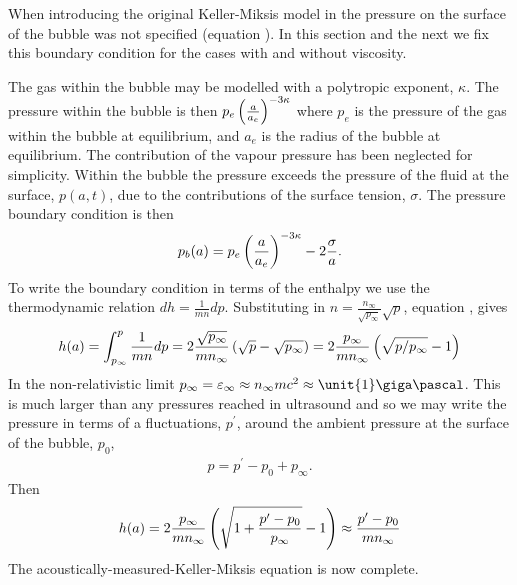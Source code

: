 When introducing the original Keller-Miksis model in  the pressure on the surface of the bubble was not specified (equation ).
In this section and the next we fix this boundary condition for the cases with and without viscosity.


The gas within the bubble may be modelled with a polytropic exponent, $\kappa$. 
The pressure within the bubble is then $p_e \left( \frac{a}{a_e} \right)^{-3\kappa}$ where $p_e$ is the pressure of the gas within the bubble at equilibrium,
and $a_e$ is the radius of the bubble at equilibrium\cite{Hoff2001}.
The contribution of the vapour pressure has been neglected for simplicity.
Within the bubble the pressure exceeds the pressure of the fluid at the surface, $p(a,t)$, due to the contributions of the surface tension, $\sigma$.
The pressure boundary condition is then
\begin{align}
  p_b(a) = p_e \left( \frac{a}{a_e} \right)^{-3\kappa} - 2\frac{\sigma}{a}. 
\end{align}
To write the boundary condition in terms of the enthalpy we use the  thermodynamic relation $d h = \frac{1}{m n} dp$.
Substituting in $n=\frac{n_\infty}{\sqrt{p_\infty}}\sqrt{p}$, equation , gives
\begin{align}
  h(a) =  \int_{p_\infty}^{p}  \frac{1}{m n}dp = 2\frac{\sqrt{p_\infty}}{mn_\infty}\left( \sqrt{p}-\sqrt{ p_\infty} \right) = 2 \frac{p_\infty}{mn_\infty} \left( \sqrt{p/p_\infty} - 1 \right) 
\end{align}
In the non-relativistic limit $p_\infty = \epsilon_\infty \approx n_\infty m c^2 \approx \unit{1}\giga\pascal$\cite{Hoff2001}.
This is much larger than any pressures reached in ultrasound and so we may write the pressure in terms of a fluctuations, $p^\prime$, around the ambient pressure at the surface of the bubble, $p_0$,
\begin{align}
  p = p^\prime - p_0 + p_\infty.
\end{align}
Then
\begin{align}
  h(a) =  2 \frac{p_\infty}{mn_\infty} \left( \sqrt{1 + \frac{p^\prime - p_0}{p_\infty}} - 1 \right) \approx \frac{p^\prime - p_0}{mn_\infty}
\end{align}
%
%
%
The acoustically-measured-Keller-Miksis equation is now complete. 


